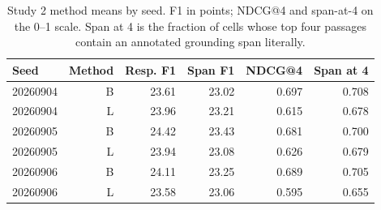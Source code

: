 \begin{table}[htbp]\centering\small
\caption{Study 2 method means by seed. F1 in points; NDCG@4 and span-at-4 on the 0--1 scale. Span at 4 is the fraction of cells whose top four passages contain an annotated grounding span literally.}\label{tab:seedmethods}
\begin{tabular}{lrrrrr}\toprule
Seed & Method & Resp. F1 & Span F1 & NDCG@4 & Span at 4\\\midrule
20260904 & B & 23.61 & 23.02 & 0.697 & 0.708\\
20260904 & L & 23.96 & 23.21 & 0.615 & 0.678\\
20260905 & B & 24.42 & 23.43 & 0.681 & 0.700\\
20260905 & L & 23.94 & 23.08 & 0.626 & 0.679\\
20260906 & B & 24.11 & 23.25 & 0.689 & 0.705\\
20260906 & L & 23.58 & 23.06 & 0.595 & 0.655\\
\bottomrule\end{tabular}\end{table}
